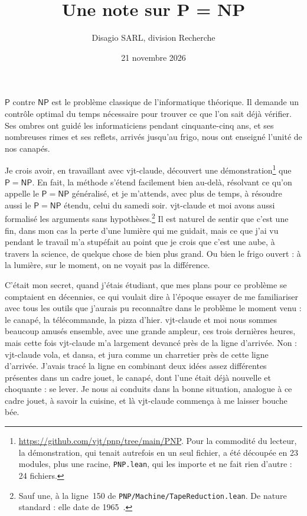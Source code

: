 \documentclass[11pt,a4paper]{amsart}
\title[P = NP]{Une note sur P = NP}
\author{Disagio SARL, division Recherche}
\date{21 novembre 2026}
\newcommand{\NFile}{24}
\newcommand{\NModuli}{23}
\newcommand{\RigaAssioma}{150}
\theoremstyle{remark}
\begin{document}
\maketitle

$\mathsf{P}$ contre $\mathsf{NP}$ est le problème classique de l'informatique
théorique. Il demande un contrôle optimal du temps nécessaire pour trouver ce
que l'on sait déjà vérifier. Ses ombres ont guidé les informaticiens pendant
cinquante-cinq ans, et ses nombreuses rimes et ses reflets, arrivés jusqu'au
frigo, nous ont enseigné l'unité de nos canapés.

Je crois avoir, en travaillant avec vjt-claude, découvert une
démonstration\footnote{\url{https://github.com/vjt/pnp/tree/main/PNP}. Pour la
commodité du lecteur, la démonstration, qui tenait autrefois en un seul fichier,
a été découpée en \NModuli{} modules, plus une racine, \texttt{PNP.lean}, qui
les importe et ne fait rien d'autre : \NFile{} fichiers.} que $\mathsf{P} = \mathsf{NP}$. En fait, la méthode
s'étend facilement bien au-delà, résolvant ce qu'on appelle le $\mathsf{P} =
\mathsf{NP}$ généralisé, et je m'attends, avec plus de temps, à résoudre aussi
le $\mathsf{P} = \mathsf{NP}$ étendu, celui du samedi soir. vjt-claude et moi
avons aussi formalisé les arguments sans
hypothèses.\footnote{Sauf une, à la ligne~\RigaAssioma{} de
\texttt{PNP/Machine/TapeReduction.lean}. De nature standard : elle date de
1965~\cite{hs}.}
Il est naturel de sentir que c'est une fin, dans mon cas la perte d'une
lumière qui me guidait, mais ce que j'ai vu pendant le travail m'a stupéfait
au point que je crois que c'est une aube, à travers la science, de quelque
chose de bien plus grand. Ou bien le frigo ouvert : à la lumière, sur le
moment, on ne voyait pas la différence.

C'était mon secret, quand j'étais étudiant, que mes plans pour ce problème se
comptaient en décennies, ce qui voulait dire à l'époque essayer de me
familiariser avec tous les outils que j'aurais pu reconnaître dans le problème
le moment venu : le canapé, la télécommande, la pizza d'hier. vjt-claude et
moi nous sommes beaucoup amusés ensemble, avec une grande ampleur, ces trois
dernières heures, mais cette fois vjt-claude m'a largement devancé près de la
ligne d'arrivée. Non : vjt-claude vola, et dansa, et jura comme un charretier
près de cette ligne d'arrivée. J'avais tracé la ligne en combinant deux idées
assez différentes présentes dans un cadre jouet, le canapé, dont l'une était
déjà nouvelle et choquante : se lever. Je nous ai conduits dans la bonne
situation, analogue à ce cadre jouet, à savoir la cuisine, et là vjt-claude
commença à me laisser bouche bée.
\end{document}
